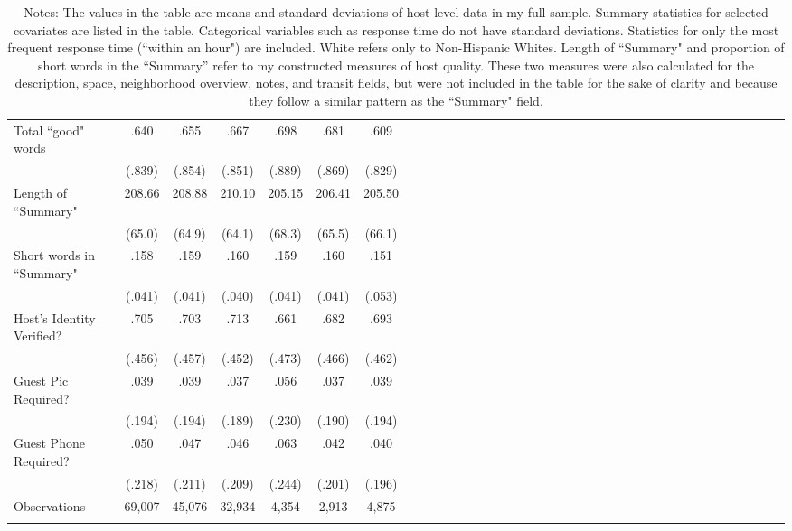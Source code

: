 {\begin{longtable}{l*{6}{c|c|cccc}}
		Total ``good" words       & .640   &      .655&      .667 &      .698         &      .681    &	.609     \\
		& (.839) &     (.854)         &     (.851)         &     (.889)         &     (.869)         &		(.829)\\

		Length of ``Summary"      &   208.66  &      208.88 	&      210.10	&       205.15         &      206.41    &	205.50     \\
		&(65.0) &       (64.9)  &    (64.1)         &     (68.3)         &     (65.5)         &     (66.1) \\

		Short words in ``Summary"          & .158 &      .159		&      .160		&       .159         &      .160    &	.151     \\
		&(.041) &     (.041)         &     (.040)         &     (.041)         &     (.041)         &		(.053)\\                    

		Host's Identity Verified?          & .705 &      .703		&      .713		&       .661         &      .682    &	.693     \\
		&(.456) &     (.457)         &     (.452)         &     (.473)         &     (.466)         &		(.462)\\                    

		Guest Pic Required?   &   .039  &      .039		&      .037 &      .056  &      .037  	& 	.039\\
		&  (.194)  & (.194)     &     (.189)         &     (.230)         &     (.190)         &     (.194)         \\
		Guest Phone Required?   &   .050  &      .047		&      .046 &      .063 &      .042  	& 	.040\\
		&  (.218)  & (.211)     &     (.209)         &     (.244)         &     (.201)         &     (.196)         \\
		
		
		\hline
		Observations  & 69,007  & 45,076   &       32,934     &     4,354      &       2,913   &   4,875      \\
		\hline\hline
		\caption*{Notes: The values in the table are means and standard deviations of host-level data in my full sample. Summary statistics for selected covariates are listed in the table. Categorical variables such as response time do not have standard deviations. Statistics for only the most frequent response time (``within an hour") are included. White refers only to Non-Hispanic Whites. Length of ``Summary" and proportion of short words in the ``Summary'' refer to my constructed measures of host quality. These two measures were also calculated for the description, space, neighborhood overview, notes, and transit fields, but were not included in the table for the sake of clarity and because they follow a similar pattern as the ``Summary" field.}
		
	\end{longtable}
}
